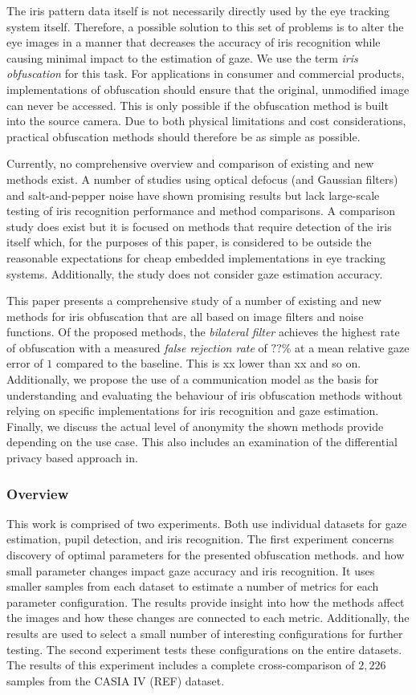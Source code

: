 The iris pattern data itself is not necessarily directly used by the eye tracking system itself. Therefore, a possible solution to this set of problems is to alter the eye images in a manner that decreases the accuracy of iris recognition while causing minimal impact to the estimation of gaze. We use the term \emph{iris obfuscation} for this task. For applications in consumer and commercial products, implementations of obfuscation should ensure that the original, unmodified image can never be accessed. This is only possible if the obfuscation method is built into the source camera. Due to both physical limitations and cost considerations, practical obfuscation methods should therefore be as simple as possible. 

Currently, no comprehensive overview and comparison of existing and new methods exist. A number of studies using optical defocus (and Gaussian filters) \cite{BRENDAN_BLUR, BRENDAN_ARTICLE} and salt-and-pepper noise \cite{BRENDAN_SNOW} have shown promising results but lack large-scale testing of iris recognition performance and method comparisons. A comparison study does exist \cite{IRIS_OBF} but it is focused on methods that require detection of the iris itself which, for the purposes of this paper, is considered to be outside the reasonable expectations for cheap embedded implementations in eye tracking systems. Additionally, the study does not consider gaze estimation accuracy. 

This paper presents a comprehensive study of a number of existing and new methods for iris obfuscation that are all based on image filters and noise functions. Of the proposed methods, the \emph{bilateral filter} achieves the highest rate of obfuscation with a measured \emph{false rejection rate} of $??\%$ at a mean relative gaze error of $1$ compared to the baseline. This is xx lower than xx and so on. Additionally, we propose the use of a communication model as the basis for understanding and evaluating the behaviour of iris obfuscation methods without relying on specific implementations for iris recognition and gaze estimation. Finally, we discuss the actual level of anonymity the shown methods provide depending on the use case. This also includes an examination of the differential privacy based approach in\cite{BRENDAN_SNOW}.

\subsubsection{Overview}
This work is comprised of two experiments. Both use individual datasets for gaze estimation, pupil detection, and iris recognition. The first experiment concerns discovery of optimal parameters for the presented obfuscation methods. and how small parameter changes impact gaze accuracy and iris recognition. It uses smaller samples from each dataset to estimate a number of metrics for each parameter configuration. The results provide insight into how the methods affect the images and how these changes are connected to each metric. Additionally, the results are used to select a small number of interesting configurations for further testing. The second experiment tests these configurations on the entire datasets. The results of this experiment includes a complete cross-comparison of $2,226$ samples from the CASIA IV (REF) dataset. 